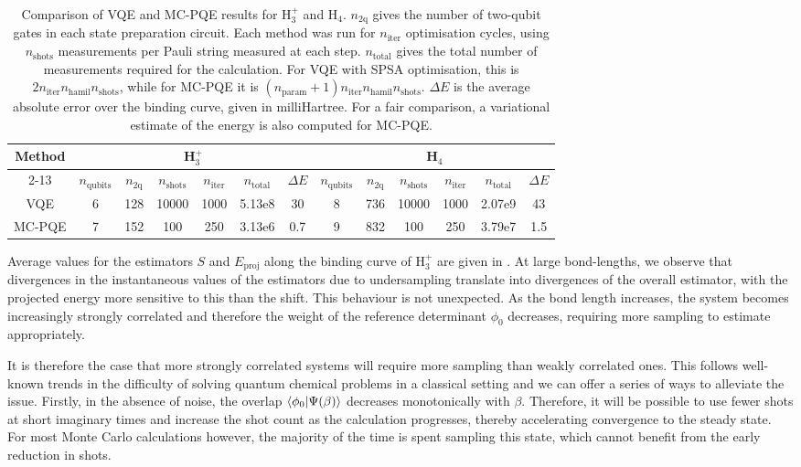 \documentclass[%
 reprint,
 amsmath,amssymb,
 aps,
]{revtex4-2}
\begin{document}
{\begin{table}[]
    \centering
    \caption{\small \justifying  Comparison of VQE and MC-PQE results for H$_3^+$ and H$_4$. $n_\mathrm{2q}$ gives the number of two-qubit gates in each state preparation circuit. Each method was run for $n_\mathrm{iter}$ optimisation cycles, using $n_\mathrm{shots}$ measurements per Pauli string measured at each step. $n_\mathrm{total}$ gives the total number of measurements required for the calculation. For VQE with SPSA optimisation, this is $2n_\mathrm{iter}n_\mathrm{hamil}n_\mathrm{shots}$, while for MC-PQE it is $(n_\mathrm{param} + 1)n_\mathrm{iter}n_\mathrm{hamil}n_\mathrm{shots}$. $\Delta E$ is the average absolute error over the binding curve, given in milliHartree. For a fair comparison, a variational estimate of the energy is also computed for MC-PQE.}
    \label{tab:comp}
    \begin{tabular}{c|c|c|c|c|c|c|c|c|c|c|c|c}
         \multirow{2}{*}{Method} & \multicolumn{6}{c|}{H$_3^+$} & \multicolumn{6}{c}{H$_4$}\\
         \cline{2-13}
         & $n_\mathrm{qubits}$ & $n_\mathrm{2q}$ & $n_\mathrm{shots}$ & $n_\mathrm{iter}$ & $n_\mathrm{total}$ & $\Delta E$ & $n_\mathrm{qubits}$ & $n_\mathrm{2q}$ & $n_\mathrm{shots}$ & $n_\mathrm{iter}$ & $n_\mathrm{total}$ &$\Delta E$ \\
         \hline
         VQE &  6 & 128 & 10000 & 1000 &  5.13e8  & 30 & 8 & 736 & 10000& 1000 & 2.07e9 & 43\\
         MC-PQE & 7 & 152& 100 & 250 & 3.13e6 & 0.7 & 9 & 832&100&250 &3.79e7& 1.5\\
         \hline
    \end{tabular}
    
\end{table}

Average values for the estimators $S$ and $E_\mathrm{proj}$ along the binding curve of H$_3^+$ are given in . At large bond-lengths, we observe that divergences in the instantaneous values of the estimators due to undersampling translate into divergences of the overall estimator, with the projected energy more sensitive to this than the shift. This behaviour is not unexpected. As the bond length increases, the system becomes increasingly strongly correlated and therefore the weight of the reference determinant $\phi_0$ decreases, requiring more sampling to estimate appropriately.

It is therefore the case that more strongly correlated systems will require more sampling than weakly correlated ones. This follows well-known trends in the difficulty of solving quantum chemical problems in a classical setting and we can offer a series of ways to alleviate the issue. Firstly, in the absence of noise, the overlap $\braket{\phi_0|\Psi(\beta)}$ decreases monotonically with $\beta$. Therefore, it will be possible to use fewer shots at short imaginary times and increase the shot count as the calculation progresses, thereby accelerating convergence to the steady state. For most Monte Carlo calculations however, the majority of the time is spent sampling this state, which cannot benefit from the early reduction in shots. 

}
\end{document}
